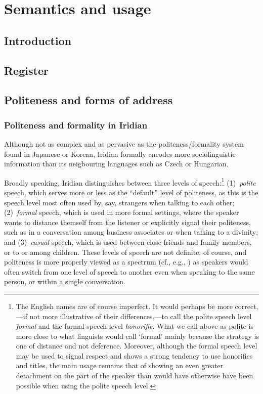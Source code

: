 \chapter{Semantics and usage}

\section{Introduction}



\section{Register}
\section{Politeness and forms of address}\label{sec:politeness}

\subsection{Politeness and formality in Iridian}

Although not as complex and as pervasive as the politeness/formality system
found in Japanese or Korean, Iridian formally
encodes more sociolinguistic information than its neigbouring
languages such as Czech or Hungarian.

Broadly speaking, Iridian distinguishes between three levels of
speech:\footnote{ The English names are of course
imperfect. It would perhaps be more correct,---if not more illustrative of their
differences,---to call the polite speech level \emph{formal} and the formal
speech level \emph{honorific}. What we call above as polite is more close to
what linguists would call `formal' mainly because the strategy is one of
distance and not deference. Moreover, although the formal speech level may be
used to signal respect and shows a strong tendency to use honorifics and titles,
the main usage remains that of showing an even greater detachment on the part of
the speaker than would have otherwise have been possible when using the polite
speech level. } (1)~\emph{polite} speech, which serves more or less as the
``default'' level of politeness, as this is the speech level most often used by,
say, strangers when talking to each other; (2)~\emph{formal} speech, which is
used in more formal settings, where the speaker wants to distance themself from
the listener or explicitly signal their politeness, such as in a conversation
among business associates or when talking to a divinity; and (3)~\emph{casual}
speech, which is used between close friends and family members, or to or among
children. These levels of speech are not definite, of course, and politeness is
more properly viewed as a spectrum (cf., e.g., \cite{hansonjap}) as speakers
would often switch from one level of speech to another even when speaking to the
same person, or within a single conversation.

